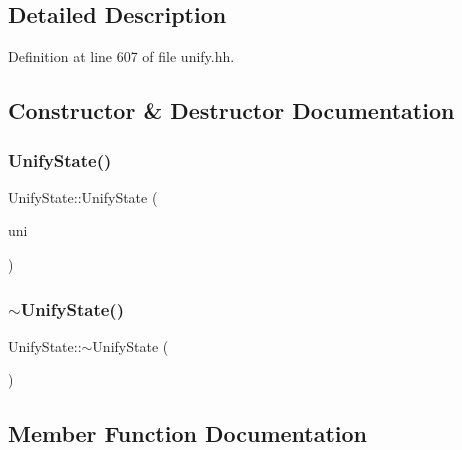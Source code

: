 \subsection{Detailed Description}


Definition at line 607 of file unify.\+hh.



\subsection{Constructor \& Destructor Documentation}
\mbox{\label{class_unify_state_ab5d4b205eeaa2371dd3e72ac624554b9}} 
\subsubsection{\texorpdfstring{UnifyState()}{UnifyState()}}
{\footnotesize\ttfamily Unify\+State\+::\+Unify\+State (\begin{DoxyParamCaption}\item[{\mbox{\hyperlink{class_constraint_group}{Constraint\+Group}} $\ast$}]{uni }\end{DoxyParamCaption})}

\mbox{\label{class_unify_state_aca7f5a5c5ab880a3f68bb33545305af3}} 
\subsubsection{\texorpdfstring{$\sim$UnifyState()}{~UnifyState()}}
{\footnotesize\ttfamily Unify\+State\+::$\sim$\+Unify\+State (\begin{DoxyParamCaption}\item[{void}]{ }\end{DoxyParamCaption})}



\subsection{Member Function Documentation}
\mbox{\label{class_unify_state_a56696c23a8dff1f9451a9bcc2d17b7e4}} 
